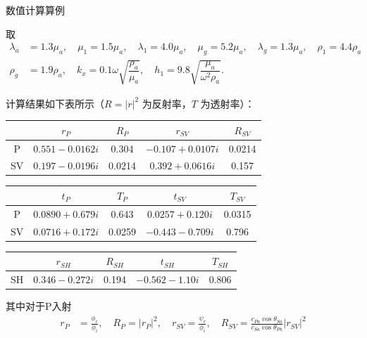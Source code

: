 \begin{exbox}
	数值计算算例

	取
	\begin{align*}
		\lambda_a &= 1.3\mu_a, \quad \mu_1 = 1.5\mu_a, \quad \lambda_1 = 4.0\mu_a, \quad \mu_g = 5.2\mu_a, \quad \lambda_g = 1.3\mu_a, \quad \rho_1 = 4.4\rho_a\\
		\rho_g &= 1.9\rho_a, \quad k_x = 0.1\omega \sqrt{\dfrac{\rho_a}{\mu_a}}, \quad h_1 = 9.8 \sqrt{\dfrac{\mu_a}{\omega^2 \rho_a}}.
	\end{align*}

	计算结果如下表所示（\(R = |r|^2\) 为反射率，\(T\) 为透射率）：

	\begin{table}[H]
		\centering
		\begin{tabular}{|c|cccc|}
			\toprule
			   & \(r_P\)             & \(R_P\) & \(r_{SV}\)           & \(R_{SV}\) \\
			\midrule
			P  & \(0.551 - 0.0162i\) & 0.304   & \(-0.107 + 0.0107i\) & 0.0214     \\
			SV & \(0.197 - 0.0196i\) & 0.0214  & \(0.392 + 0.0616i\)  & 0.157      \\
			\bottomrule
		\end{tabular}
	\end{table}
	\begin{table}[H]
		\centering
		\begin{tabular}{|c|cccc|}
			\toprule
			   & \(t_P\)             & \(T_P\) & \(t_{SV}\)          & \(T_{SV}\) \\
			\midrule
			P  & \(0.0890 + 0.679i\) & 0.643   & \(0.0257 + 0.120i\) & 0.0315     \\
			SV & \(0.0716 + 0.172i\) & 0.0259  & \(-0.443 - 0.709i\) & 0.796      \\
			\bottomrule
		\end{tabular}
	\end{table}
	\begin{table}[H]
		\centering
		\begin{tabular}{|c|cccc|}
			\toprule
			   & \(r_{SH}\)         & \(R_{SH}\) & \(t_{SH}\)         & \(T_{SH}\) \\
			\midrule
			SH & \(0.346 - 0.272i\) & 0.194      & \(-0.562 - 1.10i\) & 0.806      \\
			\bottomrule
		\end{tabular}
	\end{table}
	其中对于P入射
	\begin{align*}
		r_P &= \frac{\phi_r}{\phi_i}, \quad R_P = \left| r_P \right|^2, \quad r_{SV} = \frac{\psi_r}{\phi_i}, \quad R_{SV} = \frac{c_{Pa} \cos\theta_{Sa}}{c_{Sa} \cos\theta_{Pa}} \left| r_{SV} \right|^2\\

\end{align*}
\end{exbox}
